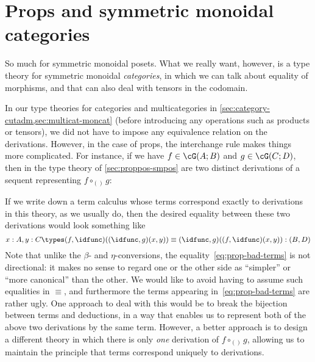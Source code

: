 \section{Props and symmetric monoidal categories}
\label{sec:prop-smc}

So much for symmetric monoidal posets.
What we really want, however, is a type theory for symmetric monoidal \emph{categories}, in which we can talk about equality of morphisms, and that can also deal with tensors in the codomain.

In our type theories for categories and multicategories in \cref{sec:category-cutadm,sec:multicat-moncat} (before introducing any operations such as products or tensors), we did not have to impose any equivalence relation on the derivations.
However, in the case of props, the interchange rule makes things more complicated.
For instance, if we have $f\in \cG(A;B)$ and $g\in\cG(C;D)$, then in the type theory of \cref{sec:proppos-smpos} are two distinct derivations of a sequent representing $f\circ_{()} g$:
If we write down a term calculus whose terms correspond exactly to derivations in this theory, as we usually do, then the desired equality between these two derivations would look something like
\begin{equation}
  x:A, y:C \types (f,\idfunc)((\idfunc,g)(x,y)) \equiv (\idfunc,g)((f,\idfunc)(x,y)) : (B,D)\label{eq:prop-bad-terms}
\end{equation}
Note that unlike the $\beta$- and $\eta$-conversions, the equality~\eqref{eq:prop-bad-terms} is not directional: it makes no sense to regard one or the other side as ``simpler'' or ``more canonical'' than the other.
We would like to avoid having to assume such equalities in $\equiv$, and furthermore the terms appearing in~\eqref{eq:prop-bad-terms} are rather ugly.
One approach to deal with this would be to break the bijection between terms and deductions, in a way that enables us to represent both of the above two derivations by the same term.
However, a better approach is to design a different theory in which there is only \emph{one} derivation of $f\circ_{()} g$, allowing us to maintain the principle that terms correspond uniquely to derivations.

